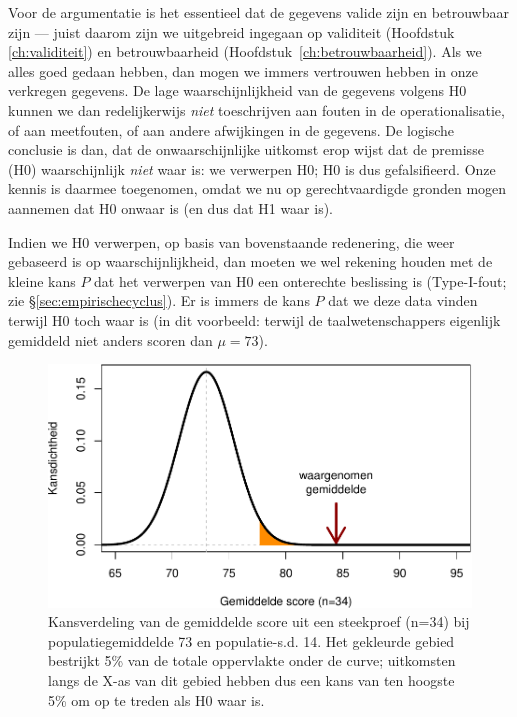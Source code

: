 \documentclass[
]{book}
\begin{document}
Voor de argumentatie is het essentieel dat de gegevens valide zijn en
betrouwbaar zijn --- juist daarom zijn we uitgebreid ingegaan op
validiteit
(Hoofdstuk \ref{ch:validiteit}) en betrouwbaarheid
(Hoofdstuk~\ref{ch:betrouwbaarheid}). Als we alles goed gedaan hebben, dan
mogen we immers vertrouwen hebben in onze verkregen gegevens. De lage
waarschijnlijkheid van de gegevens volgens H0 kunnen we dan
redelijkerwijs \emph{niet} toeschrijven aan fouten in de operationalisatie,
of aan meetfouten, of aan andere afwijkingen in de gegevens. De logische
conclusie is dan, dat de onwaarschijnlijke uitkomst erop wijst dat de
premisse (H0) waarschijnlijk \emph{niet} waar is: we verwerpen H0; H0 is dus
gefalsifieerd. Onze kennis is daarmee toegenomen, omdat we nu op
gerechtvaardigde gronden mogen aannemen dat H0 onwaar is (en dus dat H1
waar is).

Indien we H0 verwerpen, op basis van bovenstaande redenering, die weer
gebaseerd is op waarschijnlijkheid, dan moeten we wel rekening houden
met de kleine kans \(P\) dat het verwerpen van H0 een onterechte
beslissing is (Type-I-fout; zie
§\ref{sec:empirischecyclus}). Er is immers de kans \(P\) dat we deze
data vinden terwijl H0 toch waar is (in dit voorbeeld: terwijl de
taalwetenschappers eigenlijk gemiddeld niet anders scoren dan \(\mu=73\)).

\begin{figure}
\centering
\includegraphics{KMS-NL_files/figure-latex/gramm2013onesample-1.pdf}
\caption{\label{fig:gramm2013onesample}Kansverdeling van de gemiddelde score uit een steekproef (n=34) bij populatiegemiddelde 73 en populatie-s.d. 14. Het gekleurde gebied bestrijkt 5\% van de totale oppervlakte onder de curve; uitkomsten langs de X-as van dit gebied hebben dus een kans van ten hoogste 5\% om op te treden als H0 waar is.}
\end{figure}
\end{document}
